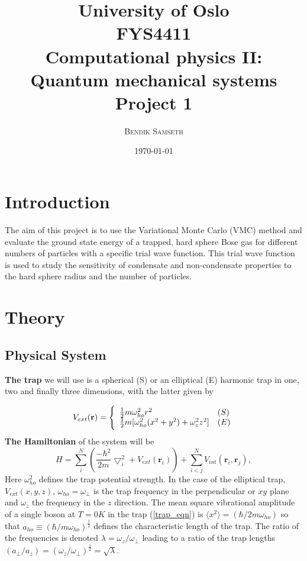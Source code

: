 \documentclass[twocolumn]{article}
\title{ \small
University of Oslo\\
FYS4411\\
Computational physics II: Quantum mechanical systems\\
\huge Project 1 }
\author{\textsc{Bendik Samseth}}
\date{\today}
\begin{document}
\maketitle


\section{Introduction}
The aim of this project is to use the Variational Monte Carlo
(VMC) method and evaluate the ground state energy of a trapped, hard
sphere Bose gas for different numbers of particles with a specific
trial wave function. This trial wave function is used to study the sensitivity of
condensate and non-condensate properties to the hard sphere radius
and the number of particles.  

\section{Theory}
\subsection{Physical System}
\textbf{The trap} we will use is a spherical (S)
or an elliptical (E) harmonic trap in one, two and finally three
dimensions, with the latter given by

\begin{equation}
    V_{ext}(\mathbf{r}) = 
    \Bigg\{
        \begin{array}{ll}
            \frac{1}{2}m\omega_{ho}^2r^2 & (S)\\
            \strut
            \frac{1}{2}m[\omega_{ho}^2(x^2+y^2) + \omega_z^2z^2] & (E)
            \label{trap_eqn}
        \end{array}
\end{equation}
\textbf{The Hamiltonian} of the system will be
\begin{equation}
    H = \sum_i^N \left(\frac{-\hbar^2}{2m}{\bigtriangledown }_{i}^2 +V_{ext}({\mathbf{r}}_i)\right)  +
     \sum_{i<j}^{N} V_{int}({\mathbf{r}}_i,{\mathbf{r}}_j),
\end{equation}
Here $\omega_{ho}^2$ defines the trap potential strength.  In the case of the
elliptical trap, $V_{ext}(x,y,z)$, $\omega_{ho}=\omega_{\perp}$ is the trap
frequency in the perpendicular or $xy$ plane and $\omega_z$ the frequency in
the $z$ direction.  The mean square vibrational amplitude of a single boson at
$T=0K$ in the trap (\ref{trap_eqn}) is $\langle
x^2\rangle=(\hbar/2m\omega_{ho})$ so that $a_{ho} \equiv
(\hbar/m\omega_{ho})^{\frac{1}{2}}$ defines the characteristic length of the
trap.  The ratio of the frequencies is denoted
$\lambda=\omega_z/\omega_{\perp}$ leading to a ratio of the trap lengths
$(a_{\perp}/a_z)=(\omega_z/\omega_{\perp})^{\frac{1}{2}} = \sqrt{\lambda}$.
\end{document}
